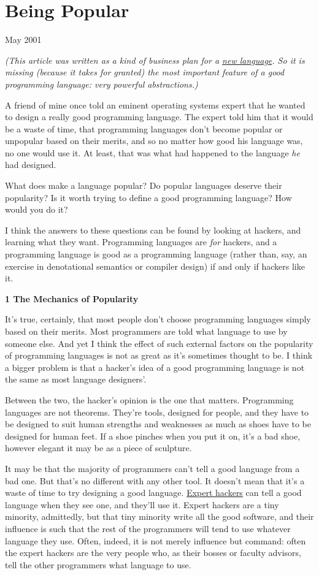 \documentclass[12pt]{book}
\begin{document}
\chapter{Being Popular}

May 2001

\emph{(This article was written as a kind of business plan for a
\href{arc.html}{new language}. So it is missing (because it takes for
granted) the most important feature of a good programming language: very
powerful abstractions.)}

A friend of mine once told an eminent operating systems expert that he
wanted to design a really good programming language. The expert told him
that it would be a waste of time, that programming languages don't
become popular or unpopular based on their merits, and so no matter how
good his language was, no one would use it. At least, that was what had
happened to the language \emph{he} had designed.

What does make a language popular? Do popular languages deserve their
popularity? Is it worth trying to define a good programming language?
How would you do it?

I think the answers to these questions can be found by looking at
hackers, and learning what they want. Programming languages are
\emph{for} hackers, and a programming language is good as a programming
language (rather than, say, an exercise in denotational semantics or
compiler design) if and only if hackers like it.

\textbf{1 The Mechanics of Popularity}

It's true, certainly, that most people don't choose programming
languages simply based on their merits. Most programmers are told what
language to use by someone else. And yet I think the effect of such
external factors on the popularity of programming languages is not as
great as it's sometimes thought to be. I think a bigger problem is that
a hacker's idea of a good programming language is not the same as most
language designers'.

Between the two, the hacker's opinion is the one that matters.
Programming languages are not theorems. They're tools, designed for
people, and they have to be designed to suit human strengths and
weaknesses as much as shoes have to be designed for human feet. If a
shoe pinches when you put it on, it's a bad shoe, however elegant it may
be as a piece of sculpture.

It may be that the majority of programmers can't tell a good language
from a bad one. But that's no different with any other tool. It doesn't
mean that it's a waste of time to try designing a good language.
\href{design.html}{Expert hackers} can tell a good language when they
see one, and they'll use it. Expert hackers are a tiny minority,
admittedly, but that tiny minority write all the good software, and
their influence is such that the rest of the programmers will tend to
use whatever language they use. Often, indeed, it is not merely
influence but command: often the expert hackers are the very people who,
as their bosses or faculty advisors, tell the other programmers what
language to use.
\end{document}
